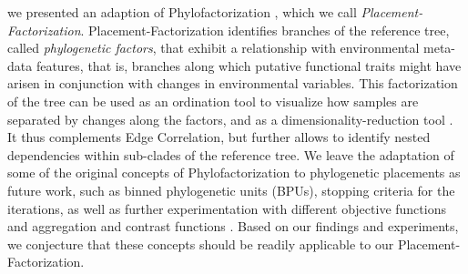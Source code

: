 we presented an adaption of Phylofactorization \cite{Washburne2017a,Washburne2019},
which we call \emph{Placement-Factorization}.
Placement-Factorization identifies branches of the reference tree, called \emph{phylogenetic factors},
that exhibit a relationship with environmental meta-data features, that is,
branches along which putative functional traits might have arisen in conjunction with changes in environmental variables.
This factorization of the tree can be used as an ordination tool to visualize
how samples are separated by changes along the factors,
and as a dimensionality-reduction tool \cite{Washburne2017a}.
It thus complements Edge Correlation, %
but further allows to identify nested dependencies within sub-clades of the reference tree.
We leave the adaptation of some of the original concepts of Phylofactorization to phylogenetic placements
as future work, such as binned phylogenetic units (BPUs), stopping criteria for the iterations,
as well as further experimentation with different objective functions and aggregation and contrast functions
\cite{Washburne2017a,Washburne2018}.
Based on our findings and experiments,
we conjecture that these concepts should be readily applicable to our Placement-Factorization.
